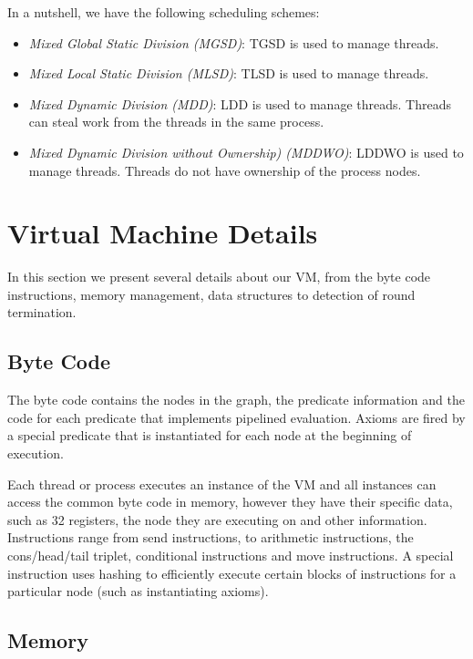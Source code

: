 \documentclass[preprint]{sigplanconf}
\begin{document}
In a nutshell, we have the following scheduling schemes:

\begin{itemize}
   \item \emph{Mixed Global Static Division (MGSD)}: TGSD is used to manage threads.
   \item \emph{Mixed Local Static Division (MLSD)}: TLSD is used to manage threads.
   \item \emph{Mixed Dynamic Division (MDD)}: LDD is used to manage threads. Threads can steal work from the threads in the same process.
   \item \emph{Mixed Dynamic Division without Ownership) (MDDWO)}: LDDWO is used to manage threads. Threads do not have ownership of the process nodes.
\end{itemize}

\section{Virtual Machine Details} 

In this section we present several details about our VM,
from the byte code instructions, memory management, data structures to detection
of round termination.

\subsection{Byte Code}

The byte code contains the nodes in the graph, the predicate information and the code for
each predicate that implements pipelined evaluation. Axioms are fired by a special predicate
that is instantiated for each node at the beginning of execution.

Each thread or process executes an instance of the VM and all instances can access the common
byte code in memory, however they have their specific data, such as 32 registers, the node they
are executing on and other information.
Instructions range from send instructions, to arithmetic instructions, the cons/head/tail triplet,
conditional instructions and move instructions. A special instruction uses hashing to efficiently
execute certain blocks of instructions for a particular node (such as instantiating axioms).

\subsection{Memory}
\end{document}
